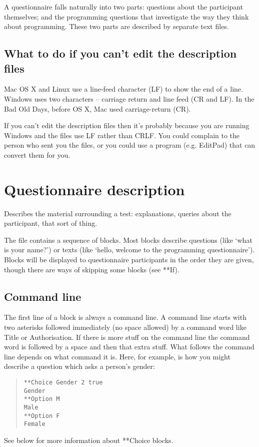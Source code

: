 \documentclass[11pt,a4paper]{article}
\newcommand{\seclabel}[1]{\label{sec:#1}}
\begin{document}
A questionnaire falls naturally into two parts: questions about the participant themselves; and the programming questions that investigate the way they think about programming. These two parts are described by separate text files.

\subsection{What to do if you can't edit the description files}

Mac OS X and Linux use a line-feed character (LF) to show the end of a line. Windows uses two characters -- carriage return and line feed (CR and LF). In the Bad Old Days, before OS X, Mac used carriage-return (CR).

If you can't edit the description files then it's probably because you are running Windows and the files use LF rather than CRLF. You could complain to the person who sent you the files, or you could use a program (e.g. EditPad) that can convert them for you.

\newpage
\section{Questionnaire description}

Describes the material surrounding a test: explanations, queries about the participant, that sort of thing.

The file contains a sequence of blocks. Most blocks describe questions (like `what is your name?') or texts (like `hello, welcome to the programming questionnaire'). Blocks will be displayed to questionnaire participants in the order they are given, though there are ways of skipping some blocks (see **If).

\subsection{Command line}
\seclabel{commandline}
The first line of a block is always a command line. A command line starts with two asterisks followed immediately (no space allowed) by a command word like Title or Authorisation. If there is more stuff on the command line the command word is followed by a space and then that extra stuff. What follows the command line depends on what command it is. Here, for example, is how you might describe a question which asks a person's gender:
\begin{quote}
\begin{verbatim}
**Choice Gender 2 true
Gender
**Option M
Male
**Option F
Female
\end{verbatim}
\end{quote}
See below for more information about **Choice blocks.
\end{document}
